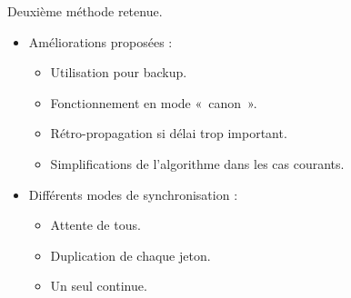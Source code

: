 \begin{frame}
	Deuxième méthode retenue.
	
	\begin{itemize}
		\item[\textbullet] Améliorations proposées : 
			\begin{itemize}
				\item Utilisation pour backup.
				\item Fonctionnement en mode «~canon~».
				\item Rétro-propagation si délai trop important.
				\item Simplifications de l'algorithme dans les cas courants.
			\end{itemize}
		\vspace{1em}
		\item[\textbullet] Différents modes de synchronisation : 
			\begin{itemize}
				\item Attente de tous.
				\item Duplication de chaque jeton.
				\item Un seul continue.
			\end{itemize}
	\end{itemize}
\end{frame}